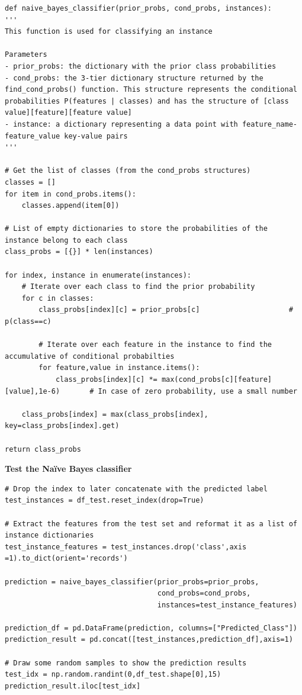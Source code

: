 \documentclass[a4paper]{article}
\begin{document}
\begin{lstlisting}
def naive_bayes_classifier(prior_probs, cond_probs, instances):
'''
This function is used for classifying an instance

Parameters
- prior_probs: the dictionary with the prior class probabilities
- cond_probs: the 3-tier dictionary structure returned by the find_cond_probs() function. This structure represents the conditional probabilities P(features | classes) and has the structure of [class value][feature][feature value]
- instance: a dictionary representing a data point with feature_name-feature_value key-value pairs
'''

# Get the list of classes (from the cond_probs structures)
classes = []
for item in cond_probs.items():
    classes.append(item[0]) 

# List of empty dictionaries to store the probabilities of the instance belong to each class
class_probs = [{}] * len(instances)                                      

for index, instance in enumerate(instances):
    # Iterate over each class to find the prior probability 
    for c in classes:
        class_probs[index][c] = prior_probs[c]                     # p(class==c)

        # Iterate over each feature in the instance to find the accumulative of conditional probabilties
        for feature,value in instance.items():
            class_probs[index][c] *= max(cond_probs[c][feature][value],1e-6)       # In case of zero probability, use a small number
    
    class_probs[index] = max(class_probs[index], key=class_probs[index].get)

return class_probs
\end{lstlisting}

\textbf{Test the Naïve Bayes classifier}
\begin{lstlisting}
# Drop the index to later concatenate with the predicted label
test_instances = df_test.reset_index(drop=True)

# Extract the features from the test set and reformat it as a list of instance dictionaries
test_instance_features = test_instances.drop('class',axis =1).to_dict(orient='records')

prediction = naive_bayes_classifier(prior_probs=prior_probs,
                                    cond_probs=cond_probs,
                                    instances=test_instance_features)

prediction_df = pd.DataFrame(prediction, columns=["Predicted_Class"])
prediction_result = pd.concat([test_instances,prediction_df],axis=1)

# Draw some random samples to show the prediction results
test_idx = np.random.randint(0,df_test.shape[0],15)
prediction_result.iloc[test_idx]

\end{lstlisting}
\end{document}
